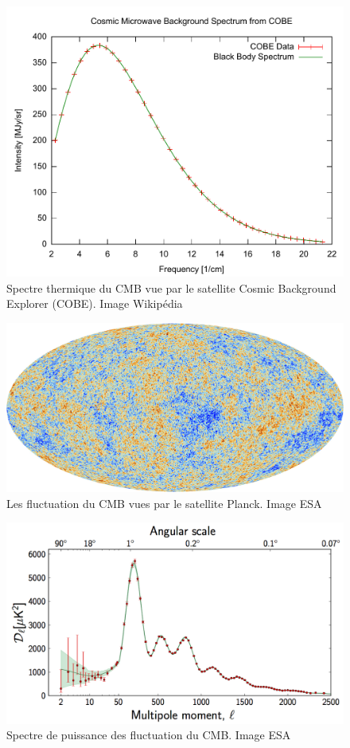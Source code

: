 \begin{figure}[bth]
        \includegraphics[width=.95\linewidth]{img/01/Cmbr.pdf} 
        \caption{Spectre thermique du CMB vue par le satellite Cosmic Background Explorer (COBE). 
        Image Wikipédia}
 		\label{fig:cmb}
\end{figure}

\begin{figure}[bth]
        \includegraphics[width=.95\linewidth]{img/01/CMB.jpeg} 
        \caption{Les fluctuation du CMB vues par le satellite Planck. 
        Image ESA}
 		\label{fig:cmb}
\end{figure}


\begin{figure}[bth]
        \includegraphics[width=.95\linewidth]{img/01/CMB_power_spectrum.png} 
        \caption{Spectre de puissance des fluctuation du CMB.
        Image ESA}
 		\label{fig:cmb}
\end{figure}


